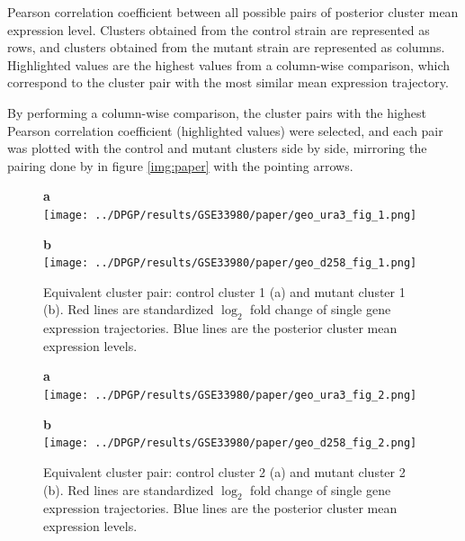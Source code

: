 \begin{table}[!ht]
    \centering\footnotesize
    
    \caption[Clusters pairwise Pearson correlation coefficient]{Pearson correlation coefficient between all possible pairs of posterior cluster mean expression level. Clusters obtained from the control strain are represented as rows, and clusters obtained from the mutant strain are represented as columns. Highlighted values are the highest values from a column-wise comparison, which correspond to the cluster pair with the most similar mean expression trajectory.}\label{tab:pearson}
\end{table}

By performing a column-wise comparison, the cluster pairs with the highest Pearson correlation coefficient (highlighted values) were selected, and each pair was plotted with the control and mutant clusters side by side, mirroring the pairing done by \citeauthor{mcdowellClusteringGeneExpression2018} in figure \ref{img:paper} with the pointing arrows. 

\begin{figure}[!ht]
    \centering
    \parbox{.4\textwidth}{
        \textbf{a}\\
        \texttt{[image: ../DPGP/results/GSE33980/paper/geo\_ura3\_fig\_1.png]}
    }
    \parbox{.4\textwidth}{
        \textbf{b}\\
        \texttt{[image: ../DPGP/results/GSE33980/paper/geo\_d258\_fig\_1.png]}
    }
    \caption[Equivalent cluster 1 pair]{Equivalent cluster pair: control cluster 1 (a) and mutant cluster 1 (b). Red lines are standardized $\log_{2}$ fold change of single gene expression trajectories. Blue lines are the posterior cluster mean expression levels.}\label{img:clust1}
\end{figure}

\begin{figure}[!ht]
    \centering
    \parbox{.4\textwidth}{
        \textbf{a}\\
        \texttt{[image: ../DPGP/results/GSE33980/paper/geo\_ura3\_fig\_2.png]}
    }
    \parbox{.4\textwidth}{
        \textbf{b}\\
        \texttt{[image: ../DPGP/results/GSE33980/paper/geo\_d258\_fig\_2.png]}
    }
    \caption[Equivalent cluster 2 pair]{Equivalent cluster pair: control cluster 2 (a) and mutant cluster 2 (b). Red lines are standardized $\log_{2}$ fold change of single gene expression trajectories. Blue lines are the posterior cluster mean expression levels.}\label{img:clust2}
\end{figure}

